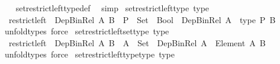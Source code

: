 \begin{isabellebody}
%
\isadelimproof
\ \ %
\endisadelimproof
%
\isatagproof
{}\isamarkupfalse%
\ set{\isacharunderscore}{\kern0pt}restrict{\isacharunderscore}{\kern0pt}left{\isacharunderscore}{\kern0pt}type{\isacharunderscore}{\kern0pt}def\ \isamarkupfalse%
\ simp%
\endisatagproof
{\isafoldproof}%
%
\isadelimproof
\isanewline
%
\endisadelimproof
\isanewline
{}\isamarkupfalse%
\ set{\isacharunderscore}{\kern0pt}restrict{\isacharunderscore}{\kern0pt}left{\isacharunderscore}{\kern0pt}type\ {\isacharbrackleft}{\kern0pt}type{\isacharbrackright}{\kern0pt}{\isacharcolon}{\kern0pt}\isanewline
\ \ {\isachardoublequoteopen}restrict{\isacharunderscore}{\kern0pt}left\ {\isacharcolon}{\kern0pt}\ Dep{\isacharunderscore}{\kern0pt}Bin{\isacharunderscore}{\kern0pt}Rel\ A\ B\ {\isasymRightarrow}\ {\isacharparenleft}{\kern0pt}P\ {\isacharcolon}{\kern0pt}\ Set\ {\isasymRightarrow}\ Bool{\isacharparenright}{\kern0pt}\ {\isasymRightarrow}\ Dep{\isacharunderscore}{\kern0pt}Bin{\isacharunderscore}{\kern0pt}Rel\ {\isacharparenleft}{\kern0pt}A\ {\isacharampersand}{\kern0pt}\ type\ P{\isacharparenright}{\kern0pt}\ B{\isachardoublequoteclose}\isanewline
%
\isadelimproof
\ \ %
\endisadelimproof
%
\isatagproof
{}\isamarkupfalse%
\ unfold{\isacharunderscore}{\kern0pt}types\ force%
\endisatagproof
{\isafoldproof}%
%
\isadelimproof
\isanewline
%
\endisadelimproof
\isanewline
{}\isamarkupfalse%
\ set{\isacharunderscore}{\kern0pt}restrict{\isacharunderscore}{\kern0pt}left{\isacharunderscore}{\kern0pt}set{\isacharunderscore}{\kern0pt}type\ {\isacharbrackleft}{\kern0pt}type{\isacharbrackright}{\kern0pt}{\isacharcolon}{\kern0pt}\isanewline
\ \ {\isachardoublequoteopen}restrict{\isacharunderscore}{\kern0pt}left\ {\isacharcolon}{\kern0pt}\ Dep{\isacharunderscore}{\kern0pt}Bin{\isacharunderscore}{\kern0pt}Rel\ A\ B\ {\isasymRightarrow}\ {\isacharparenleft}{\kern0pt}A{\isacharprime}{\kern0pt}\ {\isacharcolon}{\kern0pt}\ Set{\isacharparenright}{\kern0pt}\ {\isasymRightarrow}\ Dep{\isacharunderscore}{\kern0pt}Bin{\isacharunderscore}{\kern0pt}Rel\ {\isacharparenleft}{\kern0pt}A\ {\isacharampersand}{\kern0pt}\ Element\ A{\isacharprime}{\kern0pt}{\isacharparenright}{\kern0pt}\ B{\isachardoublequoteclose}\isanewline
\ \ \isanewline
%
\isadelimproof
\ \ %
\endisadelimproof
%
\isatagproof
{}\isamarkupfalse%
\ unfold{\isacharunderscore}{\kern0pt}types\ force%
\endisatagproof
{\isafoldproof}%
%
\isadelimproof
\isanewline
%
\endisadelimproof
\isanewline
{}\isamarkupfalse%
\ set{\isacharunderscore}{\kern0pt}restrict{\isacharunderscore}{\kern0pt}left{\isacharunderscore}{\kern0pt}type{\isacharunderscore}{\kern0pt}type\ {\isacharbrackleft}{\kern0pt}type{\isacharbrackright}{\kern0pt}{\isacharcolon}{\kern0pt}\isanewline

\end{isabellebody}
